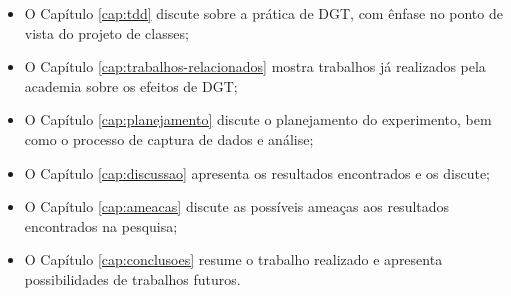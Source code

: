 \begin{itemize}
	\item O Capítulo \ref{cap:tdd} discute sobre a prática de DGT, com ênfase no
	ponto de vista do projeto de classes;
  
	\item O Capítulo \ref{cap:trabalhos-relacionados} mostra trabalhos já
	realizados pela academia sobre os efeitos de DGT;

	\item O Capítulo \ref{cap:planejamento} discute o planejamento do experimento,
	bem como o processo de captura de dados e análise;

	\item O Capítulo \ref{cap:discussao} apresenta os resultados encontrados e
	os discute;
	
	\item O Capítulo \ref{cap:ameacas} discute as possíveis ameaças aos resultados
	encontrados na pesquisa;
	
	\item O Capítulo \ref{cap:conclusoes} resume o trabalho realizado e apresenta
	possibilidades de trabalhos futuros.
\end{itemize}


